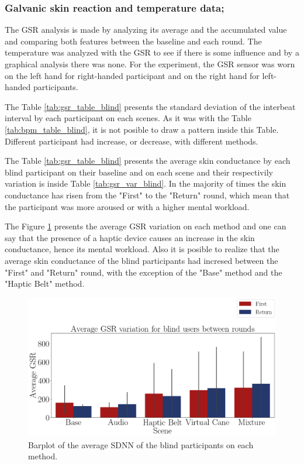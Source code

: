 \subsubsection{Galvanic skin reaction and temperature data;}
\label{subsec:results_gsr_temp}

The GSR analysis is made by analyzing its average and the accumulated value and comparing both features between the baseline and each round. The temperature was analyzed with the GSR to see if there is some influence and by a graphical analysis there was none. For the experiment, the GSR sensor was worn on the left hand for right-handed participant and on the right hand for left-handed participants.

The Table \ref{tab:gsr_table_blind} presents the standard deviation of the interbeat interval by each participant on each scenes. As it was with the Table \ref{tab:bpm_table_blind}, it is not posible to draw a pattern inside this Table. Different participant had increase, or decrease, with different methods.


The Table \ref{tab:gsr_table_blind} presents the average skin conductance by each blind participant on their baseline and on each scene and their respectivily variation is inside Table \ref{tab:gsr_var_blind}. In the majority of times the skin conductance has risen from the "First" to the "Return" round, which mean that the participant was more aroused or with a higher mental workload.





The Figure \ref{fig:barplot_gsr_avg_5_scene_blind} presents the average GSR variation on each method and one can say that the presence of a haptic device causes an increase in the skin conductance, hence its mental workload. Also it is posible to realize that the average skin conductance of the blind participants had incresed between the "First" and "Return" round, with the exception of the "Base" method and the "Haptic Belt" method.

\begin{figure}[!htb]
    \centering
    \includegraphics[width = 0.8\linewidth]{Resultados/GSR/Figuras/png/barplot_gsr_avg_5_scene_blind.png}
    \caption{Barplot of the average SDNN of the blind participants on each method.}
    \label{fig:barplot_gsr_avg_5_scene_blind}
\end{figure}

